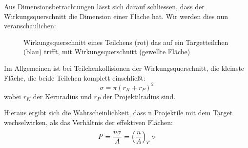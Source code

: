 \documentclass[Ex4_Zusammenfassung.tex]{subfiles}
\begin{document}
Aus Dimensionsbetrachtungen lässt sich darauf schliessen, dass der Wirkungsquerschnitt die Dimension einer Fläche hat. Wir werden dies nun veranschaulichen: 
\begin{figure}[h]
	\centering
	\caption{Wirkungsquerschnitt eines Teilchens (rot) das auf ein Targetteilchen (blau) trifft, mit Wirkungsquerschnitt (gewellte Fläche)}
\end{figure} \newline
Im Allgemeinen ist bei Teilchenkollisionen der Wirkungsquerschnitt, die kleinste Fläche, die beide Teilchen komplett einschließt: 
\begin{equation}
\sigma = \pi (r_{K} + r_{P})^2 
\end{equation}
wobei $ r_K $ der Kernradius und $ r_P $ der Projektilradius sind. 

Hieraus ergibt sich die Wahrscheinlichkeit, dass n Projektile mit dem Target wechselwirken, als das Verhältnis der effektiven Flächen:
\begin{equation}
	P = \frac{n \sigma}{A} = \left( \frac{n}{A} \right)_T \sigma
\end{equation}
\end{document}
